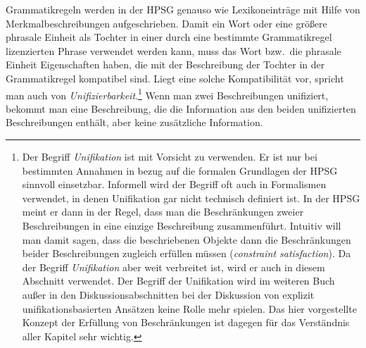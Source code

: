 \mbox{}%
Grammatikregeln werden in der HPSG genauso wie Lexikoneinträge mit Hilfe von Merkmalbeschreibungen
aufgeschrieben. %
Damit ein Wort oder eine größere phrasale Einheit als Tochter in einer durch eine bestimmte Grammatikregel lizenzierten Phrase
verwendet werden kann, muss das Wort bzw.\ die phrasale Einheit Eigenschaften haben, die mit
der Beschreibung der Tochter in der Grammatikregel kompatibel sind. Liegt eine solche Kompatibilität vor, spricht
man auch von \emph{Unifizierbarkeit}.\footnote{
  Der Begriff \emph{Unifikation} ist mit Vorsicht zu verwenden. Er ist nur bei bestimmten Annahmen
  in bezug auf die formalen Grundlagen der HPSG sinnvoll einsetzbar. Informell wird der Begriff oft
  auch in Formalismen verwendet, in denen Unifikation gar nicht technisch definiert ist. In der HPSG
  meint er dann in der Regel, dass man die Beschränkungen zweier Beschreibungen in eine einzige
  Beschreibung zusammenführt. Intuitiv will man damit sagen, dass die beschriebenen Objekte dann die
  Beschränkungen beider Beschreibungen zugleich erfüllen müssen (\emph{constraint satisfaction}). Da
  der Begriff \emph{Unifikation} aber weit verbreitet ist, wird er auch in diesem Abschnitt verwendet. Der Begriff der
  Unifikation wird im weiteren Buch außer in den Diskussionsabschnitten bei der Diskussion von explizit unifikationsbasierten
  Ansätzen keine Rolle mehr spielen. Das hier vorgestellte Konzept der
  Erfüllung von Beschränkungen ist dagegen für das Verständnis aller Kapitel sehr wichtig.%
}
Wenn man zwei Beschreibungen unifiziert, bekommt man
eine Beschreibung, die die Information aus den beiden unifizierten Beschreibungen enthält, aber
keine zusätzliche Information.

